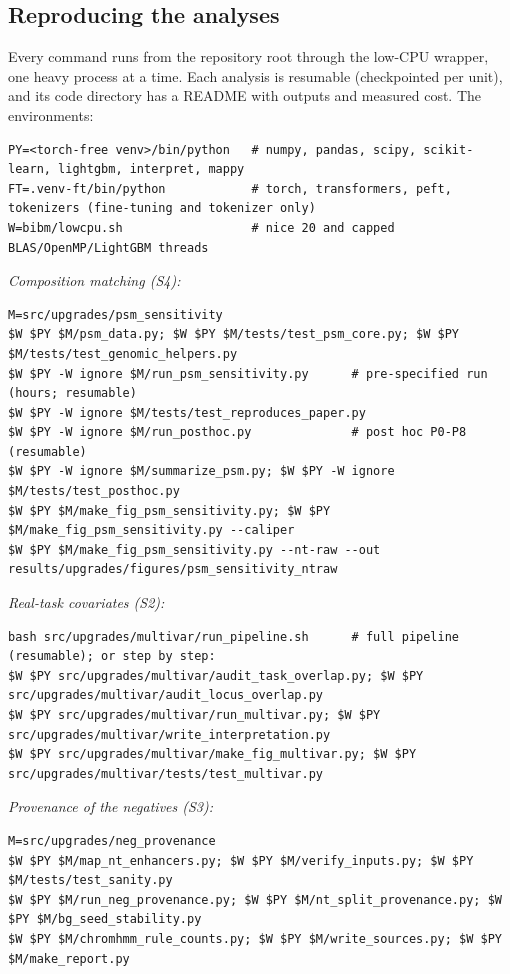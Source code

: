\documentclass[journal,onecolumn,10pt,letterpaper]{IEEEtran}
\begin{document}
\subsection{Reproducing the analyses}
Every command runs from the repository root through the low-CPU wrapper, one heavy process at a
time. Each analysis is resumable (checkpointed per unit), and its code directory has a README with
outputs and measured cost. The environments:
\begin{lstlisting}
PY=<torch-free venv>/bin/python   # numpy, pandas, scipy, scikit-learn, lightgbm, interpret, mappy
FT=.venv-ft/bin/python            # torch, transformers, peft, tokenizers (fine-tuning and tokenizer only)
W=bibm/lowcpu.sh                  # nice 20 and capped BLAS/OpenMP/LightGBM threads
\end{lstlisting}
\noindent\emph{Composition matching (S4):}
\begin{lstlisting}
M=src/upgrades/psm_sensitivity
$W $PY $M/psm_data.py; $W $PY $M/tests/test_psm_core.py; $W $PY $M/tests/test_genomic_helpers.py
$W $PY -W ignore $M/run_psm_sensitivity.py      # pre-specified run (hours; resumable)
$W $PY -W ignore $M/tests/test_reproduces_paper.py
$W $PY -W ignore $M/run_posthoc.py              # post hoc P0-P8 (resumable)
$W $PY -W ignore $M/summarize_psm.py; $W $PY -W ignore $M/tests/test_posthoc.py
$W $PY $M/make_fig_psm_sensitivity.py; $W $PY $M/make_fig_psm_sensitivity.py --caliper
$W $PY $M/make_fig_psm_sensitivity.py --nt-raw --out results/upgrades/figures/psm_sensitivity_ntraw
\end{lstlisting}
\noindent\emph{Real-task covariates (S2):}
\begin{lstlisting}
bash src/upgrades/multivar/run_pipeline.sh      # full pipeline (resumable); or step by step:
$W $PY src/upgrades/multivar/audit_task_overlap.py; $W $PY src/upgrades/multivar/audit_locus_overlap.py
$W $PY src/upgrades/multivar/run_multivar.py; $W $PY src/upgrades/multivar/write_interpretation.py
$W $PY src/upgrades/multivar/make_fig_multivar.py; $W $PY src/upgrades/multivar/tests/test_multivar.py
\end{lstlisting}
\noindent\emph{Provenance of the negatives (S3):}
\begin{lstlisting}
M=src/upgrades/neg_provenance
$W $PY $M/map_nt_enhancers.py; $W $PY $M/verify_inputs.py; $W $PY $M/tests/test_sanity.py
$W $PY $M/run_neg_provenance.py; $W $PY $M/nt_split_provenance.py; $W $PY $M/bg_seed_stability.py
$W $PY $M/chromhmm_rule_counts.py; $W $PY $M/write_sources.py; $W $PY $M/make_report.py
\end{lstlisting}
\end{document}
